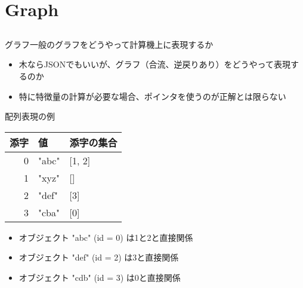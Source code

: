 \documentclass{beamer}
\begin{document}
\section{Graph}		%
\subsection{}

\begin{frame}[fragile]{グラフ}{一般のグラフをどうやって計算機上に表現するか}
\begin{itemize}%
\item 木ならJSONでもいいが、グラフ（合流、逆戻りあり）をどうやって表現するのか
\item 特に特徴量の計算が必要な場合、ポインタを使うのが正解とは限らない
\end{itemize}

配列表現の例
\begin{center}
\begin{tabular}{|r| l | l |}
\hline
添字 & 値 & 添字の集合 \\\hline
0 & "abc" & [1, 2] \\\hline
1 & "xyz" & [] \\\hline
2 & "def" & [3] \\\hline
3 & "cba" & [0] \\\hline
\end{tabular}
\end{center}

\begin{itemize}%
\item オブジェクト "abc" (id = 0) は1と2と直接関係
\item オブジェクト "def" (id = 2) は3と直接関係
\item オブジェクト "cdb" (id = 3) は0と直接関係
\end{itemize}
\end{frame}
\end{document}
